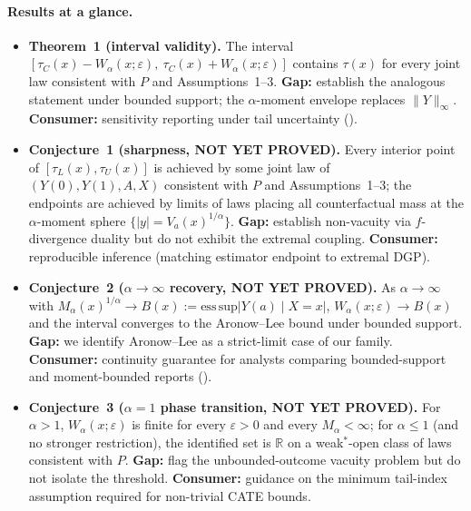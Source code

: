 \documentclass[11pt]{article}
\newcommand{\R}{\mathbb{R}}
\theoremstyle{definition}
\theoremstyle{plain}
\theoremstyle{remark}
\begin{document}
\paragraph{Results at a glance.}
\begin{itemize}[leftmargin=2em]
  \item \textbf{Theorem~1 (interval validity).} The interval
  $[\tau_C(x) - W_\alpha(x;\varepsilon),\ \tau_C(x) + W_\alpha(x;\varepsilon)]$
  contains $\tau(x)$ for every joint law consistent with $P$ and Assumptions~1--3.
  \textbf{Gap:} \citet{AronowLee2013} establish the analogous statement under
  bounded support; the $\alpha$-moment envelope replaces $\|Y\|_\infty$.
  \textbf{Consumer:} sensitivity reporting under tail uncertainty
  (\citealt{LordanSalehzadehNobari2026TailUncertainty}).
  \item \textbf{Conjecture~1 (sharpness, NOT YET PROVED).} Every interior point of
  $[\tau_L(x),\tau_U(x)]$ is achieved by some joint law of $(Y(0),Y(1),A,X)$ consistent
  with $P$ and Assumptions~1--3; the endpoints are achieved by limits of laws placing
  all counterfactual mass at the $\alpha$-moment sphere $\{|y|=V_a(x)^{1/\alpha}\}$.
  \textbf{Gap:} \citet{JungKang2026ITBounds} establish non-vacuity via $f$-divergence
  duality but do not exhibit the extremal coupling.
  \textbf{Consumer:} reproducible inference (matching estimator endpoint to extremal DGP).
  \item \textbf{Conjecture~2 ($\alpha\to\infty$ recovery, NOT YET PROVED).} As
  $\alpha\to\infty$ with $M_\alpha(x)^{1/\alpha}\to B(x) := \mathrm{ess\,sup}|Y(a)\mid X=x|$,
  $W_\alpha(x;\varepsilon) \to B(x)$ and the interval converges to the Aronow--Lee
  bound under bounded support.
  \textbf{Gap:} we identify Aronow--Lee as a strict-limit case of our family.
  \textbf{Consumer:} continuity guarantee for analysts comparing bounded-support and
  moment-bounded reports (\citealt{MiratrixWagerZubizarreta2018}).
  \item \textbf{Conjecture~3 ($\alpha=1$ phase transition, NOT YET PROVED).} For $\alpha>1$,
  $W_\alpha(x;\varepsilon)$ is finite for every $\varepsilon>0$ and every $M_\alpha<\infty$;
  for $\alpha\le 1$ (and no stronger restriction), the identified set is $\R$ on a weak$^*$-open
  class of laws consistent with $P$. \textbf{Gap:} \citet{AsiaeePalBeckHuling2026SharpGeneralization}
  flag the unbounded-outcome vacuity problem but do not isolate the threshold.
  \textbf{Consumer:} guidance on the minimum tail-index assumption required for non-trivial
  CATE bounds.
\end{itemize}
\end{document}
